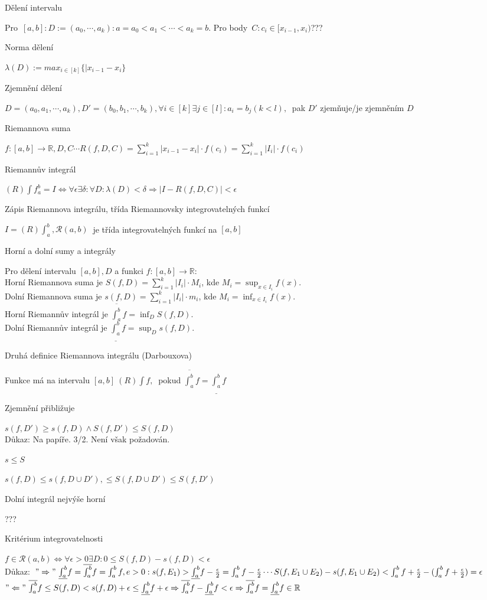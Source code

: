 \documentclass[a4paper]{article}
\theoremstyle{definition}
\newcommand{\baseAll}[3]{\begin{#1}{#2} \begin{flushleft} #3 \end{flushleft} \end{#1}}
\newcommand{\de}[2]{\baseAll{definition}{#1}{#2}}
\newcommand{\ve}[2]{\baseAll{theorem}{#1}{#2}}
\begin{document}
\de{Dělení intervalu}{Pro\ $[a,b]: D := (a_0, \cdots, a_k): a=a_0 < a_1 < \cdots < a_k = b$. Pro body\ $C: c_i \in [x_{i-1}, x_i)$???}
\de{Norma dělení}{$\lambda(D):= max_{i \in [k]} \{|x_{i-1}-x_i\}$}
\de{Zjemnění dělení}{$D=(a_0,a_1,\cdots, a_k), D'=(b_0, b_1,\cdots, b_k), \forall i \in [k] \exists j \in [l]: a_i = b_j (k<l),\ $ pak $D'$ zjemňuje/je zjemněním $D$ }
\de{Riemannova suma}{$f: [a,b]\rightarrow \mathbb{R}, D,C \cdots R(f,D,C) = \sum_{i=1}^{k} |x_{i-1}-x_i| \cdot f(c_i)=\sum_{i=1}^{k} |I_i| \cdot f(c_i)$}
\de{Riemannův integrál}{$(R)\int f_a^b = I \Leftrightarrow \forall \epsilon \exists \delta: \forall D: \lambda(D) < \delta \Rightarrow |I-R(f,D,C)| < \epsilon $}
\de{Zápis Riemannova integrálu, třída Riemannovsky integrovatelných funkcí}{$I=(R)\int_a^b, \mathscr{R}(a,b)\ $ je třída integrovatelných funkcí na $[a,b]$}
\de{Horní a dolní sumy a integrály}{Pro dělení intervalu $[a,b], D$ a funkci $f:[a,b]\rightarrow\mathbb{R}:$\\
Horní Riemannova suma je $S(f,D)=\sum_{i=1}^k|I_i|\cdot M_i$, kde $M_i=\sup_{x\in I_i}f(x)$.\\
Dolní Riemannova suma je $s(f,D)=\sum_{i=1}^k|I_i|\cdot m_i$, kde $M_i=\inf_{x\in I_i}f(x)$.\\
Horní Riemannův integrál je $\overline{\int_{a}^b}f=\inf_{D}S(f,D)$.\\
Dolní Riemannův integrál je $\underline{\int_{a}^b}f=\sup_{D}s(f,D)$.}
\de{Druhá definice Riemannova integrálu (Darbouxova)}{Funkce má na intervalu $[a,b]\ (R)\int f,\ $ pokud $\overline{\int_a^b} f = \underline{\int_a^b} f$ }
\ve{Zjemnění přibližuje}{$s(f,D') \ge s(f,D) \wedge S(f,D') \le S(f,D)$\\Důkaz: Na papíře. 3/2. Není však požadován.}
\ve{$s \le S$}{$s(f,D) \le s(f, D\cup D'), \le S(f, D\cup D') \le S(f,D')$}
\ve{Dolní integrál nejvýše horní}{???}
\ve{Kritérium integrovatelnosti}{$f \in \mathscr{R}(a,b) \Leftrightarrow \forall \epsilon >0 \exists D: 0 \le S(f,D) - s(f,D)< \epsilon$\\Důkaz:\ $"\Rightarrow"\ \underline{\int_a^b}f = \overline{\int_a^b}f = \int_a^b f, e > 0: s(f,E_1) > \underline{\int_a^b}f -\frac{\epsilon}{2} = \int_a^b f -\frac{\epsilon}{2} \cdots S(f,E_1\cup E_2)-s(f,E_1\cup E_2) < \int_a^b f + \frac{\epsilon}{2} - (\int_a^b f + \frac{\epsilon}{2} ) = \epsilon$\\ $"\Leftarrow"\ \overline{\int_a^b}f  \le S(f,D) < s(f,D) + \epsilon \le \underline{\int_a^b}f + \epsilon \Rightarrow \overline{\int_a^b}f - \underline{\int_a^b}f < \epsilon \Rightarrow \overline{\int_a^b}f = \underline{\int_a^b}f \in \mathbb{R} $}
\end{document}
